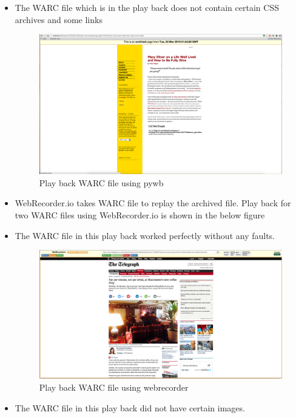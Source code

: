 \begin{itemize}
	\item The WARC file which is in the play back does not contain certain CSS archives and some links
		  \begin{figure}[ht]
		  	 \begin{center}
		  	 		\includegraphics[scale=0.40]{pywbplayback2.png}
		  	 		\caption{Play back WARC file using pywb}
			  \end{center}
		  \end{figure}
	\item WebRecorder.io takes WARC file to replay the archived file. Play back for two WARC files using WebRecorder.io is shown in the below figure
	\item The WARC file in this play back worked perfectly without any faults.		
		\begin{figure}[ht]
		  	 \begin{center}
		  	 		\includegraphics[scale=0.40]{webrecorderplayback.png}
		  	 		\caption{Play back WARC file using webrecorder}
			  \end{center}
		  \end{figure}	
	 \item The WARC file in this play back did not have certain images.

\end{itemize}
